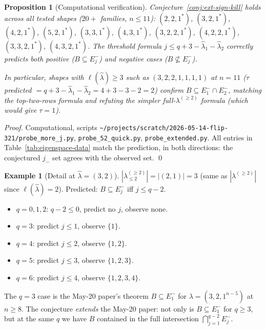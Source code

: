 \documentclass[11pt]{article}
\newtheorem{proposition}[theorem]{Proposition}
\theoremstyle{definition}
\newtheorem{example}[theorem]{Example}
\newcommand{\hatl}{\widehat\lambda}
\newcommand{\decl}{\lambda^{(\ge 2)}}
\newcommand{\decltwo}{\decl_{\le 2}}
\begin{document}
\begin{proposition}[Computational verification]\label{prop:verify}
Conjecture~\ref{conj:ext-sign-kill} holds across all tested shapes
(\(20+\) families, $n \le 11$): $(2,2,1^*)$, $(3,2,1^*)$, $(4,2,1^*)$,
$(5,2,1^*)$, $(3,3,1^*)$, $(4,3,1^*)$, $(3,2,2,1^*)$, $(4,2,2,1^*)$,
$(3,3,2,1^*)$, $(4,3,2,1^*)$.  The threshold formula
$j \le q + 3 - \hatl_1 - \hatl_2$ correctly predicts both positive
($B \subseteq E_j^-$) and negative cases ($B \not\subseteq E_j^-$).

In particular, shapes with $\ell(\hatl) \ge 3$ such as
$(3, 2, 2, 1, 1, 1, 1)$ at $n = 11$ ($\tau$ predicted $= q + 3 -
\hatl_1 - \hatl_2 = 4 + 3 - 3 - 2 = 2$) confirm $B \subseteq E_1^-
\cap E_2^-$, matching the top-two-rows formula and \emph{refuting}
the simpler full-$\decl$ formula (which would give $\tau = 1$).
\end{proposition}

\begin{proof}
Computational, scripts
\texttt{\textasciitilde/projects/scratch/2026-05-14-flip-321/probe\_more\_j.py},
\texttt{probe\_52\_quick.py}, \texttt{probe\_extended.py}.  All entries
in Table~\ref{tab:eigenspace-data} match the prediction, in both
directions: the conjectured $j_-$ set agrees with the observed set.
\qed
\end{proof}

\begin{example}[Detail at $\hatl = (3, 2)$]\label{ex:32}
$|\decltwo| = |(2, 1)| = 3$ (same as $|\decl|$ since $\ell(\hatl) = 2$).
Predicted: $B \subseteq E_j^-$ iff $j \le q - 2$.
\begin{itemize}[topsep=0.2em,itemsep=0.1em]
\item $q = 0, 1, 2$: $q - 2 \le 0$, predict no $j$, observe none. \checkmark
\item $q = 3$: predict $j \le 1$, observe $\{1\}$. \checkmark
\item $q = 4$: predict $j \le 2$, observe $\{1, 2\}$. \checkmark
\item $q = 5$: predict $j \le 3$, observe $\{1, 2, 3\}$. \checkmark
\item $q = 6$: predict $j \le 4$, observe $\{1, 2, 3, 4\}$. \checkmark
\end{itemize}
The $q = 3$ case is the May-20 paper's theorem $B \subseteq E_1^-$
for $\lambda = (3, 2, 1^{n - 5})$ at $n \ge 8$.  The conjecture
\emph{extends} the May-20 paper: not only is $B \subseteq E_1^-$ for
$q \ge 3$, but at the same $q$ we have $B$ contained in the full
intersection $\bigcap_{j=1}^{q-2} E_j^-$.
\end{example}
\end{document}
